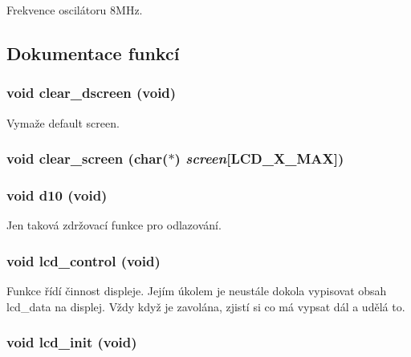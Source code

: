 Frekvence oscilátoru 8MHz. 

\subsection{Dokumentace funkcí}
\subsubsection[{clear\_\-dscreen}]{\setlength{\rightskip}{0pt plus 5cm}void clear\_\-dscreen (void)}\label{lcd_8c_af632fc4d520fbb4468baea39b68bc17e}


Vymaže default screen. 
\subsubsection[{clear\_\-screen}]{\setlength{\rightskip}{0pt plus 5cm}void clear\_\-screen (char($\ast$) {\em screen}[LCD\_\-X\_\-MAX])}\label{lcd_8c_a0d72a8b3fb4557babb0f1c61018f2327}
\subsubsection[{d10}]{\setlength{\rightskip}{0pt plus 5cm}void d10 (void)}\label{lcd_8c_ae9bb5305a03d43b839016fcc98dfee4f}


Jen taková zdržovací funkce pro odlazování. 
\subsubsection[{lcd\_\-control}]{\setlength{\rightskip}{0pt plus 5cm}void lcd\_\-control (void)}\label{lcd_8c_aac5a8ac84d029ba77193f158761d10da}
Funkce řídí činnost displeje. Jejím úkolem je neustále dokola vypisovat obsah lcd\_\-data na displej. Vždy když je zavolána, zjistí si co má vypsat dál a udělá to. 
\subsubsection[{lcd\_\-init}]{\setlength{\rightskip}{0pt plus 5cm}void lcd\_\-init (void)}\label{lcd_8c_a6842775ba83d166f02b8fef8bb63b1e6}
